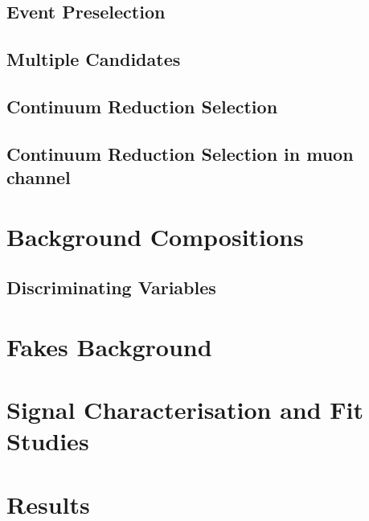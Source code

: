 \documentclass[NOTE, atlasdraft=true, texlive=2016, UKenglish]{atlasdoc}
\begin{document}
\subsection{Event Preselection}
\label{sec:preselection}


\subsection{Multiple Candidates}


\subsection{Continuum Reduction Selection}


\subsection{Continuum Reduction Selection in muon channel}


\section{Background Compositions}
\label{sec:background}


\subsection{Discriminating Variables}

\section{Fakes Background}
\label{sec:FakesBackground}

\section{Signal Characterisation and Fit Studies}
\label{sec:signal}


\section{Results}
\label{sec:result}
\end{document}
